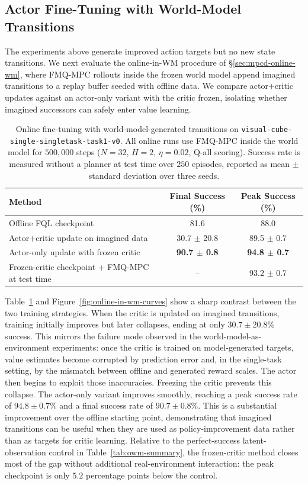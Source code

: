 \subsection{Actor Fine-Tuning with World-Model Transitions}
\label{sec:exp-mpc-online-wm}

The experiments above generate improved action targets but no new
state transitions. We next evaluate the online-in-WM procedure of
\S\ref{sec:mpcd-online-wm}, where FMQ-MPC rollouts inside the frozen
world model append imagined transitions to a replay buffer seeded with
offline data. We compare actor+critic updates against an actor-only
variant with the critic frozen, isolating whether imagined successors
can safely enter value learning.

\begin{table}[h]
\centering
\caption{Online fine-tuning with world-model-generated transitions on
\texttt{visual-cube-single-singletask-task1-v0}. All online runs use
FMQ-MPC inside the world model for $500{,}000$ steps
($N=32$, $H=2$, $\eta=0.02$, Q-all scoring). Success rate is measured
without a planner at test time over $250$ episodes, reported as mean
$\pm$ standard deviation over three seeds.}
\label{tab:mpc-online-e2}
\begin{tabular}{lcc}
\toprule
Method & Final Success (\%) & Peak Success (\%) \\
\midrule
Offline FQL checkpoint & 81.6 & 88.0 \\
Actor+critic update on imagined data & 30.7 $\pm$ 20.8 & 89.5 $\pm$ 0.7 \\
Actor-only update with frozen critic & \textbf{90.7 $\pm$ 0.8} & \textbf{94.8 $\pm$ 0.7} \\
\midrule
Frozen-critic checkpoint + FMQ-MPC at test time & -- & 93.2 $\pm$ 0.7 \\
\bottomrule
\end{tabular}
\end{table}

Table~\ref{tab:mpc-online-e2} and Figure~\ref{fig:online-in-wm-curves} show a sharp contrast between the two
training strategies. When the critic is updated on imagined transitions,
training initially improves but later collapses, ending at only
$30.7 \pm 20.8\%$ success. This mirrors the failure mode observed in
the world-model-as-environment experiments: once the critic is trained
on model-generated targets, value estimates become corrupted by
prediction error and, in the single-task setting, by the mismatch
between offline and generated reward scales. The actor then begins to
exploit those inaccuracies.
Freezing the critic prevents this collapse. The actor-only variant
improves smoothly, reaching a peak success rate of
$94.8 \pm 0.7\%$ and a final success rate of $90.7 \pm 0.8\%$. This is a
substantial improvement over the offline starting point, demonstrating
that imagined transitions can be useful when they are used as
policy-improvement data rather than as targets for critic learning.
Relative to the perfect-success latent-observation control in
Table~\ref{tab:owm-summary}, the frozen-critic method closes most of the
gap without additional real-environment interaction: the peak checkpoint
is only $5.2$ percentage points below the control.

